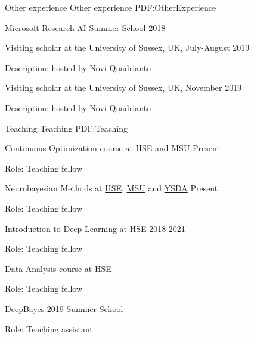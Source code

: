 \documentclass[letterpaper,MMMyyyy,nonstopmode]{simpleresumecv}
\begin{document}
\begin{Body}

\Section
{Other experience}
{Other experience}
{PDF:OtherExperience}

\Gap
\BulletItem
\href{https://www.microsoft.com/en-us/research/event/ai-summer-school-2018/}{Microsoft Research AI Summer School 2018}

\BulletItem Visiting scholar at the University of Sussex, UK, July-August 2019
\begin{Detail}
\Item
Description: hosted by \href{http://www.sussex.ac.uk/profiles/335583}{Novi Quadrianto}
\end{Detail}

\BulletItem Visiting scholar at the University of Sussex, UK, November 2019
\begin{Detail}
\Item
Description: hosted by \href{http://www.sussex.ac.uk/profiles/335583}{Novi Quadrianto}
\end{Detail}


\BigGap


\Section
{Teaching}
{Teaching}
{PDF:Teaching}

\BulletItem
Continuous Optimization course at \href{https://cs.hse.ru/en/}{HSE} and \href{https://cs.msu.ru/en}{MSU}
\hfill
Present
\begin{Detail}
\Item
Role: Teaching fellow
\end{Detail}

\BulletItem
Neurobayesian Methods at \href{https://cs.hse.ru/en/}{HSE}, \href{https://cs.msu.ru/en}{MSU} and \href{https://yandexdataschool.com}{YSDA}
\hfill
Present
\begin{Detail}
\Item
Role: Teaching fellow
\end{Detail}

\BulletItem
Introduction to Deep Learning at \href{https://cs.hse.ru/en/}{HSE}
\hfill
2018-2021
\begin{Detail}
\Item
Role: Teaching fellow
\end{Detail}

\BulletItem
Data Analysis course at \href{https://cs.hse.ru/en/}{HSE}
\hfill
{}
\begin{Detail}
\Item
Role: Teaching fellow
\end{Detail}

\BulletItem
\href{http://deepbayes.ru}{DeepBayes 2019 Summer School}
\hfill
{}
\begin{Detail}
\Item
Role: Teaching assistant
\end{Detail}


\end{Body}
\end{document}
